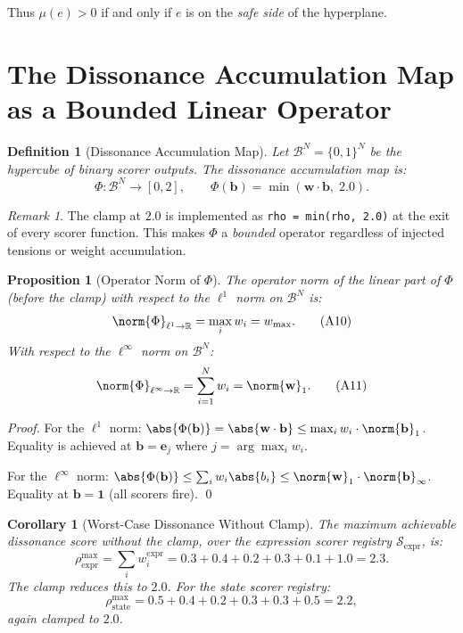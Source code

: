 \documentclass[11pt,letterpaper]{article}
\newtheorem{proposition}[theorem]{Proposition}
\newtheorem{definition}[theorem]{Definition}
\newtheorem{corollary}[theorem]{Corollary}
\theoremstyle{remark}
\newtheorem{remark}[theorem]{Remark}
\newcommand{\rhosys}{\rho}
\begin{document}
Thus $\mu(e) > 0$ if and only if $e$ is on the \emph{safe side} of the
hyperplane.

\section{The Dissonance Accumulation Map as a Bounded Linear Operator}
\label{sec:operator}

\begin{definition}[Dissonance Accumulation Map]
\label{def:rho-map}
Let $\mathcal{B}^N = \{0,1\}^N$ be the hypercube of binary scorer outputs.
The \emph{dissonance accumulation map} is:
\[
  \Phi: \mathcal{B}^N \to [0,2], \qquad
  \Phi(\mathbf{b}) = \min\!\left(\mathbf{w} \cdot \mathbf{b},\; 2.0\right). \tag{A9}
\]
\end{definition}

\begin{remark}
The clamp at $2.0$ is implemented as \texttt{rho = min(rho, 2.0)} at the
exit of every scorer function.  This makes $\Phi$ a \emph{bounded} operator
regardless of injected tensions or weight accumulation.
\end{remark}

\begin{proposition}[Operator Norm of $\Phi$]
\label{prop:opnorm}
The operator norm of the linear part of $\Phi$ (before the clamp) with
respect to the $\ell^1$ norm on $\mathcal{B}^N$ is:
\[
  \norm{\Phi}_{\ell^1 \to \mathbb{R}}
  = \max_{i} w_i
  = w_{\max}. \tag{A10}
\]
With respect to the $\ell^\infty$ norm on $\mathcal{B}^N$:
\[
  \norm{\Phi}_{\ell^\infty \to \mathbb{R}}
  = \sum_{i=1}^{N} w_i
  = \norm{\mathbf{w}}_1. \tag{A11}
\]
\end{proposition}

\begin{proof}
For the $\ell^1$ norm: $\abs{\Phi(\mathbf{b})} = \abs{\mathbf{w} \cdot \mathbf{b}}
\leq \max_i w_i \cdot \norm{\mathbf{b}}_1$.  Equality is achieved at
$\mathbf{b} = \mathbf{e}_j$ where $j = \arg\max_i w_i$.

For the $\ell^\infty$ norm: $\abs{\Phi(\mathbf{b})} \leq \sum_i w_i \abs{b_i}
\leq \norm{\mathbf{w}}_1 \cdot \norm{\mathbf{b}}_\infty$.
Equality at $\mathbf{b} = \mathbf{1}$ (all scorers fire). \qed
\end{proof}

\begin{corollary}[Worst-Case Dissonance Without Clamp]
\label{cor:worst-case}
The maximum achievable dissonance score without the clamp, over the
expression scorer registry $\mathcal{S}_{\text{expr}}$, is:
\[
  \rhosys^{\max}_{\text{expr}}
  = \sum_{i} w_i^{\text{expr}}
  = 0.3 + 0.4 + 0.2 + 0.3 + 0.1 + 1.0
  = 2.3. \tag{A12}
\]
The clamp reduces this to $2.0$.  For the state scorer registry:
\[
  \rhosys^{\max}_{\text{state}}
  = 0.5 + 0.4 + 0.2 + 0.3 + 0.3 + 0.5
  = 2.2,
\]
again clamped to $2.0$.
\end{corollary}
\end{document}
